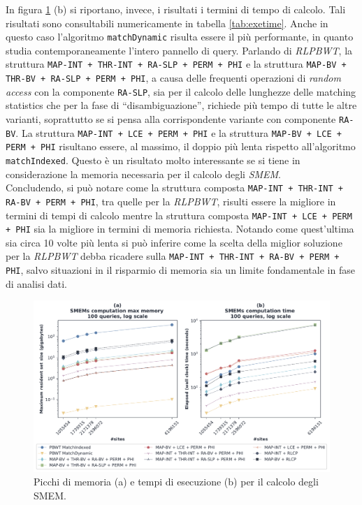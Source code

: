 In figura \ref{fig:smemtimememchr} (b) si riportano, invece, i risultati i
termini di tempo di calcolo.  Tali risultati sono
consultabili numericamente in tabella \ref{tab:exetime}. Anche in questo caso
l'algoritmo 
\texttt{matchDynamic} risulta essere il più performante, in quanto studia
contemporaneamente l'intero pannello di query. Parlando di \textit{RLPBWT},  la
struttura \texttt{MAP-INT + THR-INT + RA-SLP + PERM + PHI} e la 
struttura 
\texttt{MAP-BV + THR-BV + RA-SLP + PERM + PHI}, a causa delle
frequenti operazioni di \textit{random access} con la componente
\texttt{RA-SLP}, sia per il calcolo delle lunghezze delle 
matching statistics che per la fase di ``disambiguazione'', richiede più tempo
di tutte le altre varianti, soprattutto se si pensa alla corrispondente
variante con componente \texttt{RA-BV}. La struttura \texttt{MAP-INT + LCE +
  PERM + PHI} e la struttura 
\texttt{MAP-BV + LCE + PERM + PHI} risultano essere, al massimo,
il doppio più lenta rispetto all'algoritmo \texttt{matchIndexed}. Questo è un
risultato molto interessante se si tiene in considerazione la memoria necessaria
per il calcolo degli \textit{SMEM}.\\
Concludendo, si può  notare come la struttura composta
\texttt{MAP-INT + THR-INT + RA-BV + PERM + PHI}, tra quelle per la
\textit{RLPBWT}, risulti essere la migliore in termini di tempi di calcolo
mentre la struttura composta \texttt{MAP-INT + LCE + PERM + PHI} sia la
migliore in termini di memoria richiesta. Notando come quest'ultima sia circa 10
volte più lenta si può inferire come la scelta della miglior soluzione per la
\textit{RLPBWT} debba ricadere sulla \texttt{MAP-INT + THR-INT + RA-BV + PERM +
  PHI}, salvo situazioni in il risparmio di memoria sia un limite fondamentale
in fase di analisi dati. 
\begin{figure}
  \centering
  \includegraphics[width=\linewidth]{img/exe_time_mem_paper}
  \caption{Picchi di memoria (a) e tempi di esecuzione (b) per il calcolo degli
    SMEM.}
  \label{fig:smemtimememchr}
\end{figure}


